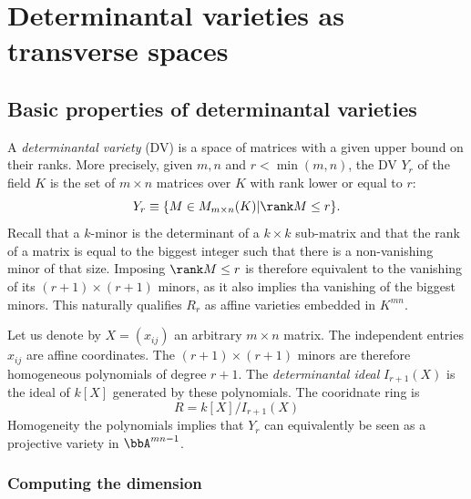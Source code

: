 \section{Determinantal varieties as transverse spaces}

    \subsection{Basic properties of determinantal varieties}  

            A \emph{determinantal variety} (DV) is a space of matrices with a given upper bound on their ranks. More precisely, given $m,n$ and $r<\min(m,n)$, the DV $Y_r$ of the field $K$ is the set of $m\times n$ matrices over $K$ with rank lower or equal to $r$:
            \begin{equation}
                Y_r\equiv\{M\in M_{m\times n}(K)|\rank M\leq r\}.
            \end{equation}
            Recall that a $k$-minor is the determinant of a $k\times k$ sub-matrix and that the rank of a matrix is equal to the biggest integer such that there is a non-vanishing minor of that size. Imposing $\rank M\leq r$ is therefore equivalent to the vanishing of its $(r+1)\times (r+1)$ minors, as it also implies tha vanishing of the biggest minors. This naturally qualifies $R_r$ as affine varieties embedded in $K^{mn}$. 
            
            Let us denote by $X=(x_{ij})$ an arbitrary $m\times n$ matrix. The independent entries $x_{ij}$ are affine coordinates. The $(r+1)\times(r+1)$ minors are therefore homogeneous polynomials of degree $r+1$. The \emph{determinantal ideal} $I_{r+1}(X)$ is the ideal of $k[X]$ generated by these polynomials. The cooridnate ring is 
            \begin{equation}
                R=k[X]/I_{r+1}(X)
            \end{equation}
            Homogeneity the polynomials implies that $Y_r$ can equivalently be seen as a projective variety in $\bbA^{mn-1}$.

        \subsubsection{Computing the dimension}
            
